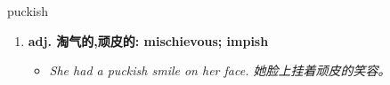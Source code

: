 
\begin{frame}
{\huge puckish}
\begin{center}
\begin{enumerate}\Large
  \item \textbf{adj. 淘气的,顽皮的: mischievous; impish}
  \begin{itemize}
    \item \em{\Large{She had a puckish smile on her face. 她脸上挂着顽皮的笑容。}}
  \end{itemize}
\end{enumerate}
\end{center}
\end{frame}
